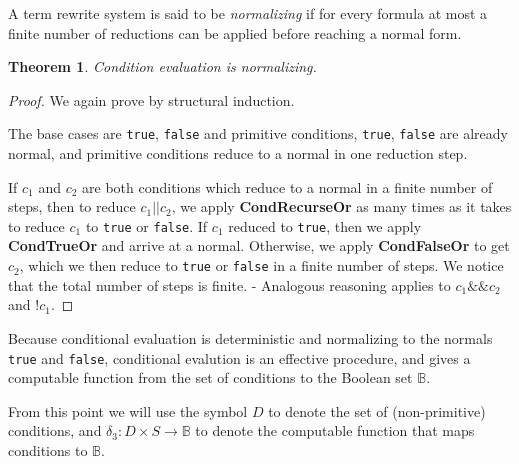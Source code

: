 \documentclass[11pt]{article}
\begin{document}
A term rewrite system is said to be \emph{normalizing} if for every formula at most a finite number of reductions can be applied before reaching a normal form.

\newtheorem*{conditionalsnormalizing}{Theorem}
\begin{conditionalsnormalizing}
Condition evaluation is normalizing.
\end{conditionalsnormalizing}

\begin{proof}
We again prove by structural induction.

The base cases are \texttt{true}, \texttt{false} and primitive conditions, \texttt{true}, \texttt{false} are already normal, and primitive conditions reduce to a normal in one reduction step.

If $c_{1}$ and $c_{2}$ are both conditions which reduce to a normal in a finite number of steps, then to reduce $c_{1}\texttt{||}c_{2}$, we apply \textbf{CondRecurseOr} as many times as it takes to reduce $c_{1}$ to \texttt{true} or \texttt{false}.  If $c_{1}$ reduced to \texttt{true}, then we apply \textbf{CondTrueOr} and arrive at a normal.  Otherwise, we apply \textbf{CondFalseOr} to get $c_{2}$, which we then reduce to \texttt{true} or \texttt{false} in a finite number of steps.  We notice that the total number of steps is finite.
-
Analogous reasoning applies to $c_{1}\texttt{\&\&}c_{2}$ and $\texttt{!}c_{1}$.
\end{proof}

Because conditional evaluation is deterministic and normalizing to the normals \texttt{true} and \texttt{false}, conditional evalution is an effective procedure, and gives a computable function from the set of conditions to the Boolean set $\mathbb{B}$.

From this point we will use the symbol $D$ to denote the set of (non-primitive) conditions, and $\delta_{3} : D \times S \rightarrow \mathbb{B}$ to denote the computable function that maps conditions to $\mathbb{B}$.
\end{document}
